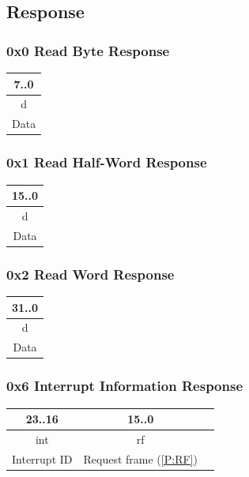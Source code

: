 \documentclass[a4paper,10pt]{article}
\begin{document}
\subsection{Response}
\subsubsection{0x0 Read Byte Response}
\begin{table}[H]
	\centering
	{
		\begin{tabular}{|c|}
\hline
7..0 \\
\hline
d \\
\hline
Data \\
\hline
		\end{tabular}
	}
\end{table}

\subsubsection{0x1 Read Half-Word Response}
\begin{table}[H]
	\centering
	{
		\begin{tabular}{|c|}
\hline
15..0 \\
\hline
d \\
\hline
Data \\
\hline
		\end{tabular}
	}
\end{table}

\subsubsection{0x2 Read Word Response}
\begin{table}[H]
	\centering
	{
		\begin{tabular}{|c|}
\hline
31..0 \\
\hline
d \\
\hline
Data \\
\hline
		\end{tabular}
	}
\end{table}

\subsubsection{0x6 Interrupt Information Response}
\begin{table}[H]
	\centering
	{
		\begin{tabular}{|c|c|c|}
\hline
23..16 & 15..0 \\
\hline
int & rf \\
\hline
Interrupt ID & Request frame (\ref{P:RF}) \\
\hline
		\end{tabular}
	}
\end{table}
\end{document}
